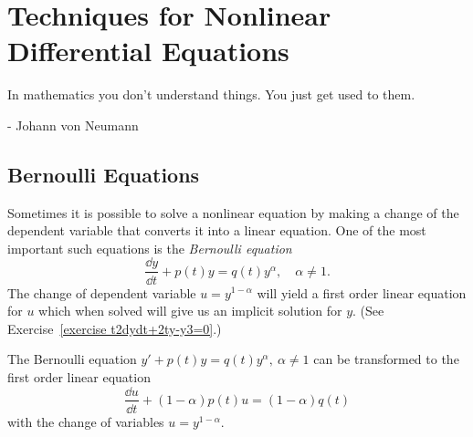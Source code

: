\flushbottom





\chapter{Techniques for Nonlinear Differential Equations}


In mathematics you don't understand things. You just get used to them.

\begin{flushright}
  - Johann von Neumann
\end{flushright}





\section{Bernoulli Equations}


Sometimes it is possible to solve a nonlinear equation by
making a change of the dependent variable that converts it into a
linear equation.  One of the most important such equations is the
\textit{Bernoulli equation}
\[
\frac{\dd y}{\dd t} + p(t) y = q(t) y^\alpha, \quad \alpha \neq 1.
\]
The change of dependent variable $u = y^{1-\alpha}$ will yield a first order linear
equation for $u$ which when solved will give us an
implicit solution for $y$.  (See Exercise~\ref{exercise t2dydt+2ty-y3=0}.)




\begin{Result}
  The Bernoulli equation $y' + p(t) y = q(t) y^\alpha,\ \alpha \neq 1$ can 
  be transformed to the first order linear equation
  \[
  \frac{\dd u}{\dd t} + (1-\alpha) p(t) u = (1 - \alpha) q(t)
  \]
  with the change of variables $u = y^{1-\alpha}$.
\end{Result}







